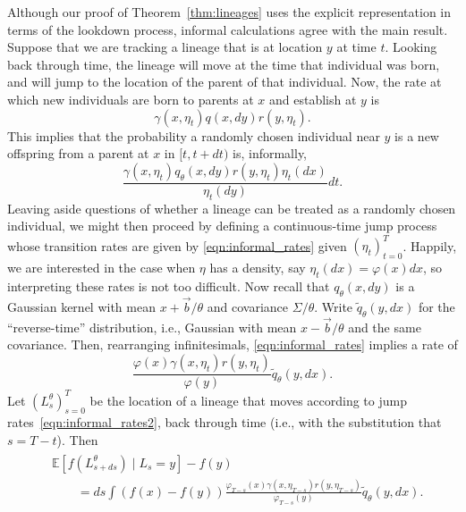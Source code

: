 \documentclass[12pt]{article}
\newcommand{\IE}{\mathbb E}
\newcommand{\meanq}{\vec b}    %
\newcommand{\covq}{\Sigma}     %
\begin{document}
Although our proof of Theorem~\ref{thm:lineages}
uses the explicit representation in terms of the lookdown process,
informal calculations agree with the main result.
Suppose that we are tracking a lineage that is at location $y$ at time $t$.
Looking back through time, the lineage will move at the time that individual was born,
and will jump to the location of the parent of that individual.
Now, the rate at which new individuals are born to parents at $x$ and establish at $y$
is
$$
    \gamma(x, \eta_t) q(x, dy) r(y, \eta_t) .
$$
This implies that the probability a randomly chosen individual near $y$
is a new offspring from a parent at $x$ in $[t, t+dt)$ is, informally,
\begin{equation} \label{eqn:informal_rates}
\frac{
    \gamma(x, \eta_t) q_\theta(x, dy) r(y, \eta_t) \eta_t(dx)
}{
    \eta_t(dy)
} dt .
\end{equation}
Leaving aside questions of whether a lineage can be treated as a randomly chosen individual,
we might then proceed by defining a continuous-time jump process
whose transition rates are given by \eqref{eqn:informal_rates} given $(\eta_t)_{t=0}^T$.
Happily, we are interested in the case when $\eta$ has a density,
say $\eta_t(dx) = \varphi(x) dx$,
so interpreting these rates is not too difficult.
Now recall that $q_\theta(x, dy)$ is a Gaussian kernel
with mean $x + \meanq/\theta$ and covariance $\covq/\theta$.
Write $\widetilde q_\theta(y, dx)$ for the ``reverse-time'' distribution,
i.e., Gaussian with mean $x - \meanq/\theta$ and the same covariance.
Then, rearranging infinitesimals,
\eqref{eqn:informal_rates} implies a rate of
\begin{equation} \label{eqn:informal_rates2}
\frac{
    \varphi(x) \gamma(x, \eta_t) r(y, \eta_t)
}{
    \varphi(y)
} \widetilde q_\theta(y, dx) .
\end{equation}
Let $(L^\theta_s)_{s=0}^T$ be the location of a lineage that moves according to
jump rates~\eqref{eqn:informal_rates2},
back through time (i.e., with the substitution that $s = T-t$).
Then
\begin{align} \label{eqn:lineage_generator_Edt}
    \begin{split}
    &\IE[f(L^\theta_{s+ds}) \;|\; L_s = y] - f(y)
    \\&\qquad 
    =
    ds \int \left(f(x) - f(y)\right)
    \frac{
        \varphi_{T-s}(x) \gamma(x, \eta_{T-s}) r(y, \eta_{T-s})
    }{
        \varphi_{T-s}(y)
    }
    \widetilde q_\theta(y, dx) .
    \end{split}
\end{align}
\end{document}
